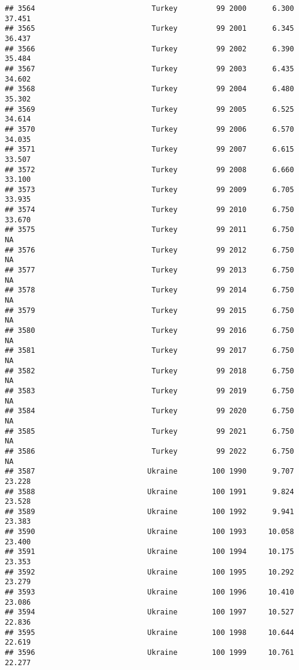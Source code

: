 \documentclass[
]{article}
\begin{document}
\begin{verbatim}
## 3564                           Turkey         99 2000      6.300     37.451
## 3565                           Turkey         99 2001      6.345     36.437
## 3566                           Turkey         99 2002      6.390     35.484
## 3567                           Turkey         99 2003      6.435     34.602
## 3568                           Turkey         99 2004      6.480     35.302
## 3569                           Turkey         99 2005      6.525     34.614
## 3570                           Turkey         99 2006      6.570     34.035
## 3571                           Turkey         99 2007      6.615     33.507
## 3572                           Turkey         99 2008      6.660     33.100
## 3573                           Turkey         99 2009      6.705     33.935
## 3574                           Turkey         99 2010      6.750     33.670
## 3575                           Turkey         99 2011      6.750         NA
## 3576                           Turkey         99 2012      6.750         NA
## 3577                           Turkey         99 2013      6.750         NA
## 3578                           Turkey         99 2014      6.750         NA
## 3579                           Turkey         99 2015      6.750         NA
## 3580                           Turkey         99 2016      6.750         NA
## 3581                           Turkey         99 2017      6.750         NA
## 3582                           Turkey         99 2018      6.750         NA
## 3583                           Turkey         99 2019      6.750         NA
## 3584                           Turkey         99 2020      6.750         NA
## 3585                           Turkey         99 2021      6.750         NA
## 3586                           Turkey         99 2022      6.750         NA
## 3587                          Ukraine        100 1990      9.707     23.228
## 3588                          Ukraine        100 1991      9.824     23.528
## 3589                          Ukraine        100 1992      9.941     23.383
## 3590                          Ukraine        100 1993     10.058     23.400
## 3591                          Ukraine        100 1994     10.175     23.353
## 3592                          Ukraine        100 1995     10.292     23.279
## 3593                          Ukraine        100 1996     10.410     23.086
## 3594                          Ukraine        100 1997     10.527     22.836
## 3595                          Ukraine        100 1998     10.644     22.619
## 3596                          Ukraine        100 1999     10.761     22.277

\end{verbatim}
\end{document}

